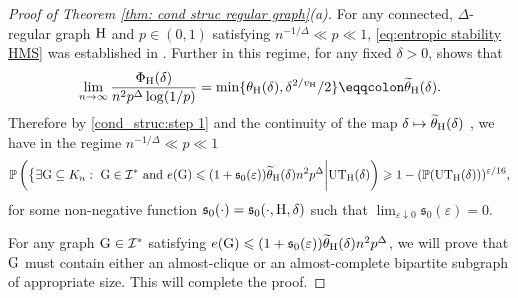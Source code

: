 \documentclass[a4paper,11pt,english,reqno]{amsart}
\numberwithin{equation}{section}
\renewcommand{\leq}{\leqslant}
\renewcommand{\geq}{\geqslant}
\newcommand{\UTH}{\textup{UT}_{\textup{H}}(\delta)}
\newcommand{\uH}{\textup{H}}
\renewcommand{\P}{\mathbb{P}}
\newcommand{\tu}[1]{\textup{#1}}
\begin{document}
\begin{proof}[Proof of Theorem \ref{thm: cond struc regular graph}(a)]
For any connected, $\Delta$-regular graph $\uH$ and $p\in (0,1)$ satisfying $n^{-1/\Delta}\ll p\ll 1$,  
\eqref{eq:entropic stability HMS} was established in \cite[Section~7]{HMS}. Further in this regime, for any fixed  $\delta>0$, \cite{BGLZ} shows that 
\begin{equation}
	\label{limit variational problem:regular}
	\lim_{n\rightarrow\infty} \frac{\Phi_{\uH}(\delta)}{n^{2}p^{\Delta}\log(1/p)} = \min\{\theta_{\uH}(\delta), \delta^{2/v_{\uH}}/2\} \eqqcolon \widetilde{\theta}_{\tu{H}}(\delta).
\end{equation}
Therefore  by \eqref{cond_struc:step 1} %
and the continuity of the map $\delta\mapsto \widetilde{\theta}_{\tu{H}}(\delta)$ , we have in the regime $n^{-1/\Delta}\ll p\ll 1$
\begin{equation*}
	\P\left(\big\{\exists \tu{G}\subseteq K_{n}:\ \tu{G}\in \mathcal{I}^{*}\tu{ and }e(\tu{G})\leq (1+\mathfrak{s}_{0}(\varepsilon))\widetilde{\theta}_{\tu{H}}(\delta)n^{2}p^{\Delta}\bigg| \UTH\right)\geq 1-(\P(\UTH))^{\varepsilon/16},
\end{equation*}
for some non-negative function $\mathfrak{s}_{0}(\cdot) = \mathfrak{s}_{0}(\cdot, \uH, \delta)$ such that $\lim_{\varepsilon\downarrow 0}\mathfrak{s}_{0}(\varepsilon) = 0$.  

For any graph $\tu{G}\in \mathcal{I}^{*}$ satisfying $e(\tu{G})\leq (1+\mathfrak{s}_{0}(\varepsilon))\widetilde{\theta}_{\tu{H}}(\delta) n^{2}p^{\Delta}$, we will prove that $\tu{G}$ must contain either an almost-clique or an almost-complete bipartite subgraph of appropriate size. This will complete the proof. %


\end{proof}
\end{document}
